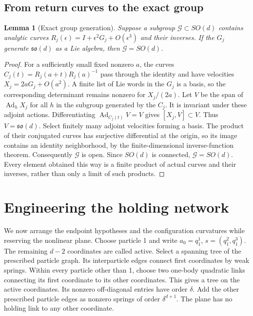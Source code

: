 \documentclass[11pt]{article}
\numberwithin{equation}{section}
\newtheorem{lemma}[lemma]{Lemma}
\theoremstyle{definition}
\begin{document}
\subsection{From return curves to the exact group}

\begin{lemma}[Exact group generation]\label{lem:exactgroup}
Suppose a subgroup $\mathscr G\subset SO(d)$ contains analytic curves
$R_j(\epsilon)=I+\epsilon^2G_j+O(\epsilon^3)$ and their inverses.
If the $G_j$ generate $\mathfrak{so}(d)$ as a Lie algebra, then
$\mathscr G=SO(d)$.
\end{lemma}

\begin{proof}
For a sufficiently small fixed nonzero $a$, the curves
$C_j(t)=R_j(a+t)R_j(a)^{-1}$ pass through the identity and have
velocities $X_j=2aG_j+O(a^2)$.
A finite list of Lie words in the $G_j$ is a basis, so the
corresponding determinant remains nonzero for $X_j/(2a)$.
Let $V$ be the span of $\operatorname{Ad}_hX_j$ for all
$h$ in the subgroup generated by the $C_j$. It is invariant under
these adjoint actions. Differentiating
$\operatorname{Ad}_{C_j(t)}V=V$ gives $[X_j,V]\subset V$.
Thus $V=\mathfrak{so}(d)$.
Select finitely many adjoint velocities forming a basis. The product
of their conjugated curves has surjective differential at the
origin, so its image contains an identity neighborhood, by the
finite-dimensional inverse-function theorem. Consequently
$\mathscr G$ is open. Since $SO(d)$ is connected, $\mathscr G=SO(d)$.
Every element obtained this way is a finite product of actual curves
and their inverses, rather than only a limit of such products.
\end{proof}

\section{Engineering the holding network}\label{sec:engineering}

We now arrange the endpoint hypotheses and the configuration
curvatures while reserving the nonlinear plane.
Choose particle 1 and write $a_0=q_1^1$, $s=(q_1^2,q_1^3)$.
The remaining $d-2$ coordinates are called active.
Select a spanning tree of the prescribed particle graph. Its
interparticle edges connect first coordinates by weak springs.
Within every particle other than 1, choose two one-body quadratic
links connecting its first coordinate to its other coordinates.
This gives a tree on the active coordinates. Its nonzero
off-diagonal entries have order $\delta$. Add the other prescribed
particle edges as nonzero springs of order $\delta^{d+1}$.
The plane has no holding link to any other coordinate.
\end{document}
